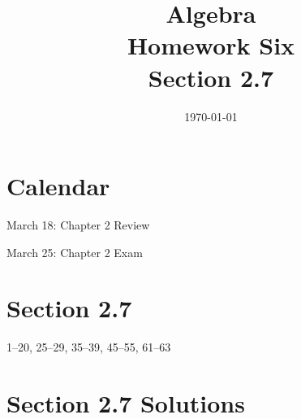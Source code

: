\documentclass[letterpaper, landscape]{exam}
\title{Algebra \\ Homework Six \\ Section 2.7 }
\author{}
\date{\today}
\begin{document}
  \maketitle

  \ifprintanswers{}
  \else
    \section{Calendar}

    \begin{itemize*}
      \item March 18: Chapter 2 Review
      \item March 25: Chapter 2 Exam
    \end{itemize*}
  \fi

  \section{Section 2.7}
  1--20, 25--29, 35--39, 45--55, 61--63


  \ifprintanswers{}

    \section{Section 2.7 Solutions} 
\end{document}
